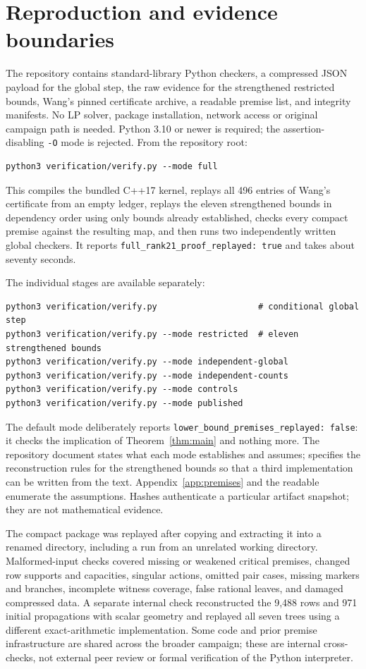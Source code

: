 \documentclass[11pt]{article}
\theoremstyle{definition}
\begin{document}
\section{Reproduction and evidence boundaries}\label{sec:reproduction}
The repository contains standard-library Python checkers, a compressed JSON payload for the global step, the raw evidence for the strengthened restricted bounds, Wang's pinned certificate archive, a readable premise list, and integrity manifests. No LP solver, package installation, network access or original campaign path is needed. Python 3.10 or newer is required; the assertion-disabling \texttt{-O} mode is rejected. From the repository root:
\begin{verbatim}
python3 verification/verify.py --mode full
\end{verbatim}
This compiles the bundled C++17 kernel, replays all 496 entries of Wang's certificate from an empty ledger, replays the eleven strengthened bounds in dependency order using only bounds already established, checks every compact premise against the resulting map, and then runs two independently written global checkers. It reports \texttt{full\_rank21\_proof\_replayed: true} and takes about seventy seconds.

The individual stages are available separately:
\begin{verbatim}
python3 verification/verify.py                    # conditional global step
python3 verification/verify.py --mode restricted  # eleven strengthened bounds
python3 verification/verify.py --mode independent-global
python3 verification/verify.py --mode independent-counts
python3 verification/verify.py --mode controls
python3 verification/verify.py --mode published
\end{verbatim}
The default mode deliberately reports \texttt{lower\_bound\_premises\_replayed: false}: it checks the implication of Theorem~\ref{thm:main} and nothing more. The repository document  states what each mode establishes and assumes;  specifies the reconstruction rules for the strengthened bounds so that a third implementation can be written from the text. Appendix~\ref{app:premises} and the readable  enumerate the assumptions. Hashes authenticate a particular artifact snapshot; they are not mathematical evidence.

The compact package was replayed after copying and extracting it into a renamed directory, including a run from an unrelated working directory. Malformed-input checks covered missing or weakened critical premises, changed row supports and capacities, singular actions, omitted pair cases, missing markers and branches, incomplete witness coverage, false rational leaves, and damaged compressed data. A separate internal check reconstructed the 9,488 rows and 971 initial propagations with scalar geometry and replayed all seven trees using a different exact-arithmetic implementation. Some code and prior premise infrastructure are shared across the broader campaign; these are internal cross-checks, not external peer review or formal verification of the Python interpreter.
\end{document}
